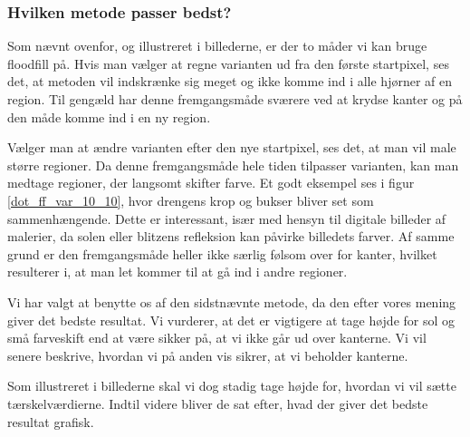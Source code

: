 {\subsubsection{Hvilken metode passer bedst?}
Som nævnt ovenfor, og illustreret i billederne, er der to måder vi kan
bruge floodfill på. Hvis man vælger at regne varianten ud fra den første
startpixel, ses det, at metoden vil indskrænke sig meget og ikke komme
ind i alle hjørner af en region. Til gengæld har denne fremgangsmåde
sværere ved at krydse kanter og på den måde komme ind i en ny region.

Vælger man at ændre varianten efter den nye startpixel, ses det, at man
vil male større regioner. Da denne fremgangsmåde hele tiden tilpasser
varianten, kan man medtage regioner, der langsomt skifter farve. Et godt
eksempel ses i figur \ref{dot_ff_var_10_10}, hvor drengens krop og
bukser bliver set som sammenhængende. Dette er interessant, især med
hensyn til digitale billeder af malerier, da solen eller blitzens
refleksion kan påvirke billedets farver. Af samme grund er den
fremgangsmåde heller ikke særlig følsom over for kanter, hvilket
resulterer i, at man let kommer til at gå ind i andre regioner.

Vi har valgt at benytte os af den sidstnævnte metode, da den efter vores
mening giver det bedste resultat. Vi vurderer, at det er vigtigere at
tage højde for sol og små farveskift end at være sikker på, at vi ikke
går ud over kanterne. Vi vil senere beskrive, hvordan vi på anden vis
sikrer, at vi beholder kanterne.

Som illustreret i billederne skal vi dog stadig tage højde for, hvordan
vi vil sætte tærskelværdierne. Indtil videre bliver de sat efter, hvad
der giver det bedste resultat grafisk.


}

